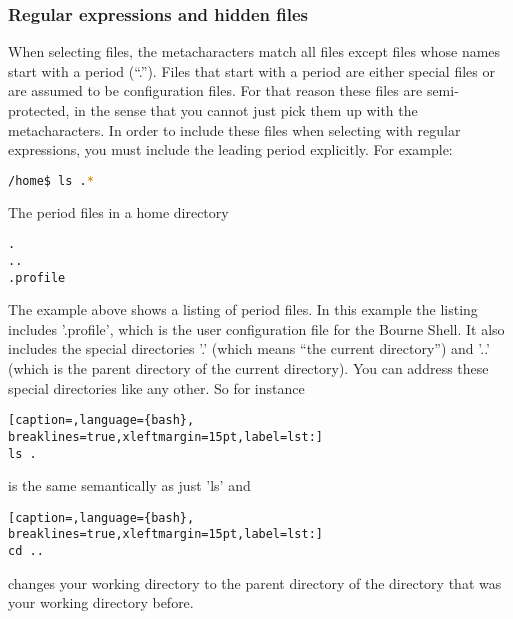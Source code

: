 \subsubsection{Regular expressions and hidden files}
When selecting files, the metacharacters match all files except files whose
names start with a period (``.''). Files that start with a period are either
special files or are assumed to be configuration files. For that reason these
files are semi-protected, in the sense that you cannot just pick them up with
the metacharacters. In order to include these files when selecting with regular
expressions, you must include the leading period explicitly. For example:
\lstset{basicstyle=\scriptsize, numbers=left, captionpos=b, tabsize=4}
\begin{lstlisting}[caption=Lising all files whose names start with a period,language={bash},
breaklines=true,xleftmargin=15pt,label=lst:Lising all files whose names start with a period]
/home$ ls .*
\end{lstlisting}

The period files in a home directory
\scriptsize
\begin{verbatim}
.
..
.profile
\end{verbatim}
\normalsize

The example above shows a listing of period files. In this example the listing
includes '.profile', which is the user configuration file for the Bourne Shell.
It also includes the special directories '.' (which means ``the current
directory'') and '..' (which is the parent directory of the current directory).
You can address these special directories like any other. So for instance
\lstset{basicstyle=\scriptsize, numbers=left, captionpos=b, tabsize=4}
\begin{lstlisting}[caption=,language={bash},
breaklines=true,xleftmargin=15pt,label=lst:]
ls .
\end{lstlisting}

is the same semantically as just 'ls' and 
\lstset{basicstyle=\scriptsize, numbers=left, captionpos=b, tabsize=4}
\begin{lstlisting}[caption=,language={bash},
breaklines=true,xleftmargin=15pt,label=lst:]
cd ..
\end{lstlisting}

changes your working directory to the parent directory of the directory that
was your working directory before.

